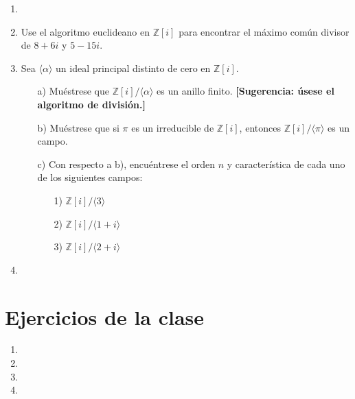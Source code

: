 \documentclass[12pt]{article}
\theoremstyle{definition}
\theoremstyle{remark}
\begin{document}
\begin{enumerate}
    \item  
    
    \item Use el algoritmo euclideano en $\mathbb{Z}[i]$ para encontrar el máximo común divisor de $8 + 6i$ y $5 - 15i$.

    \item Sea $\langle \alpha \rangle$ un ideal principal distinto de cero en $\mathbb{Z}[i]$.
    
    \begin{enumerate}
        \item[a)] Muéstrese que $\mathbb{Z}[i]/\langle \alpha \rangle$ es un anillo finito. \textbf{[Sugerencia: úsese el algoritmo de división.]}
        
        \item[b)] Muéstrese que si $\pi$ es un irreducible de $\mathbb{Z}[i]$, entonces $\mathbb{Z}[i]/\langle \pi \rangle$ es un campo.
        
        \item[c)] Con respecto a b), encuéntrese el orden $n$ y característica de cada uno de los siguientes campos:
        
        \begin{enumerate}
            \item[1)] $\mathbb{Z}[i]/\langle 3 \rangle$
            \item[2)] $\mathbb{Z}[i]/\langle 1 + i \rangle$
            \item[3)] $\mathbb{Z}[i]/\langle 2 + i \rangle$
        \end{enumerate}
    \end{enumerate}

    \item 
\end{enumerate}


\section*{Ejercicios de la clase}
\begin{enumerate}
    \item 
    \item 
    \item 
    \item 

\end{enumerate}
\end{document}
